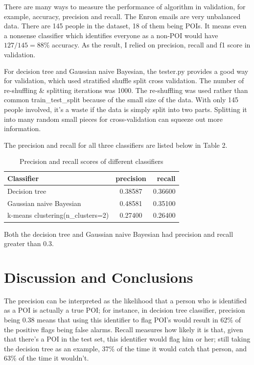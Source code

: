 \documentclass[12pt]{article}
\begin{document}
There are many ways to measure the performance of algorithm in validation, for example, accuracy, precision and recall. The Enron emails are very unbalanced data. There are 145 people in the dataset, 18 of them being POIs. It means even a nonsense classifier which identifies everyone as a non-POI would have $127/145=88\%$ accuracy. As the result, I relied on precision, recall and f1 score in validation.

For decision tree and Gaussian naive Bayesian, the tester.py provides a good way for validation, which used stratified shuffle split cross validation.  The number of re-shuffling \& splitting iterations was 1000. The re-shuffling was used rather than common train\_test\_split because of the small size of the data. With only 145 people involved, it's a waste if the data is simply split into two parts. Splitting it into many random small pieces for cross-validation can squeeze out more information.

The precision and recall for all three classifiers are listed below in Table 2.

\begin{table}[h]
\caption{Precision and recall scores of different classifiers}
\centering
\begin{tabular}{lcr}
\toprule
Classifier & precision & recall \\
\midrule
Decision tree & 0.38587 & 0.36600 \\
Gaussian naive Bayesian & 0.48581 & 0.35100 \\
k-means clustering(n\_clusters=2) & 0.27400 & 0.26400 \\
\bottomrule
\end{tabular}
\end{table}

Both the decision tree and Gaussian naive Bayesian had precision and recall greater than 0.3.
\section{Discussion and Conclusions}
The precision can be interpreted as the likelihood that a person who is identified as a POI is actually a true POI; for instance, in decision tree classifier, precision being 0.38 means that using this identifier to flag POI's would result in 62\% of the positive flags being false alarms.  Recall measures how likely it is that, given that there's a POI in the test set, this identifier would flag him or her; still taking the decision tree as an example, 37\% of the time it would catch that person, and 63\% of the time it wouldn't.
\end{document}

